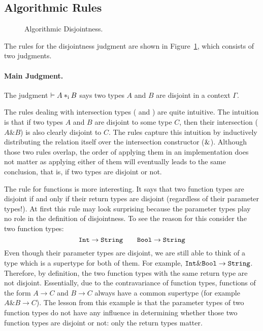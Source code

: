 \subsection{Algorithmic Rules}

\begin{figure}[h]


  \caption{Algorithmic Disjointness.}
  \label{fig:disjointness}
\end{figure}

The rules for the disjointness judgment are shown in
Figure~\ref{fig:disjointness}, which consists of two judgments.

\paragraph{Main Judgment.} The judgment $\vdash A *_\textnormal{i} B$ says
two types $A$ and $B$ are disjoint in a context
$\Gamma$.

The rules dealing with intersection types ( and
) are quite intuitive. The intuition is that if two
types $A$ and $B$ are disjoint to some type $C$, then their intersection
($A\&B$) is also clearly disjoint to $C$.  The rules capture this intuition by
inductively distributing the relation itself over the intersection constructor
($\&$). Although those two rules overlap, the order of applying them in an
implementation does not matter as applying either of them will eventually leads
to the same conclusion, that is, if two types are disjoint or not.

The rule for functions  is more interesting. It says that two function
types are disjoint if and only if their return types are disjoint (regardless of
their parameter types!). At first this rule may look surprising
because the parameter types play no role in the definition of
disjointness. To see the reason for this consider the two function types:
\[ \texttt{Int} \to \texttt{String} \qquad \texttt{Bool} \to \texttt{String} \]
Even though their parameter types are disjoint, we are still able to think of a
type which is a supertype for both of them. For example, $ \texttt{Int} \& \texttt{Bool}
\to \texttt{String} $. Therefore, by definition, the two function types with
the same return type are not
disjoint. Essentially, due to the contravariance of function types,
functions of the form $A \to C$ and $B \to C$ always have a common
supertype (for example $A \& B \to C$).
The lesson from this example is that the parameter types of two
function types do not have any influence in determining whether those two function
types are disjoint or not: only the return types matter.

